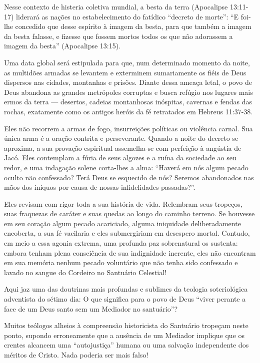 Nesse contexto de histeria coletiva mundial, a besta da terra (Apocalipse 13:11-17) liderará as nações no estabelecimento do fatídico ``decreto de morte'':
``E foi-lhe concedido que desse espírito à imagem da besta, para que também a imagem da besta falasse, e fizesse que fossem mortos todos os que não adorassem a imagem da besta'' (Apocalipse 13:15).

Uma data global será estipulada para que, num determinado momento da noite, as multidões armadas se levantem e exterminem sumariamente os fiéis de Deus dispersos nas cidades, montanhas e prisões. Diante dessa ameaça letal, o povo de Deus abandona as grandes metrópoles corruptas e busca refúgio nos lugares mais ermos da terra — desertos, cadeias montanhosas inóspitas, cavernas e fendas das rochas, exatamente como os antigos heróis da fé retratados em Hebreus 11:37-38.

Eles não recorrem a armas de fogo, insurreições políticas ou violência carnal. Sua única arma é a oração contrita e perseverante. Quando a noite do decreto se aproxima, a sua provação espiritual assemelha-se com perfeição à angústia de Jacó. Eles contemplam a fúria de seus algozes e a ruína da sociedade ao seu redor, e uma indagação solene corta-lhes a alma: ``Haverá em nós algum pecado oculto não confessado? Terá Deus se esquecido de nós? Seremos abandonados nas mãos dos iníquos por causa de nossas infidelidades passadas?''.

Eles revisam com rigor toda a sua história de vida. Relembram seus tropeços, suas fraquezas de caráter e suas quedas ao longo do caminho terreno. Se houvesse em seu coração algum pecado acariciado, alguma iniquidade deliberadamente encoberta, a sua fé vacilaria e eles submergiriam em desespero mortal. Contudo, em meio a essa agonia extrema, uma profunda paz sobrenatural os sustenta: embora tenham plena consciência de sua indignidade inerente, eles não encontram em sua memória nenhum pecado voluntário que não tenha sido confessado e lavado no sangue do Cordeiro no Santuário Celestial!

Aqui jaz uma das doutrinas mais profundas e sublimes da teologia soteriológica adventista do sétimo dia: O que significa para o povo de Deus ``viver perante a face de um Deus santo sem um Mediador no santuário''?

Muitos teólogos alheios à compreensão historicista do Santuário tropeçam neste ponto, supondo erroneamente que a ausência de um Mediador implique que os crentes alcancem uma ``autojustiça'' humana ou uma salvação independente dos méritos de Cristo. Nada poderia ser mais falso!

